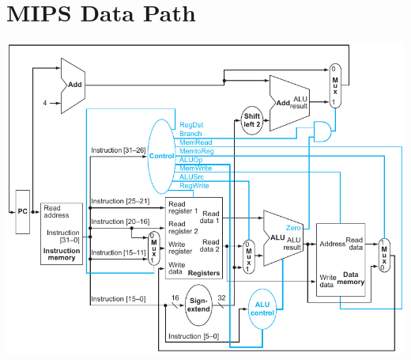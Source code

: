 \documentclass[10pt]{article}
\begin{document}
\vfill

\clearpage


\begin{minipage}[t]{0.64\linewidth}
    \begin{minipage}[t]{\linewidth}
        \section*{MIPS Data Path}
        \centering
        \includegraphics[width=\linewidth]{content/fig417.pdf}
    \end{minipage}
\end{minipage}
\end{document}
